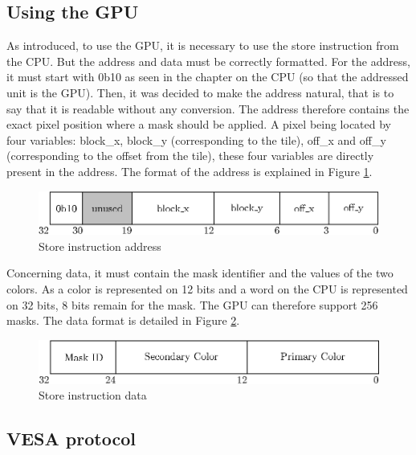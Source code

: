 \subsection{Using the GPU}

As introduced, to use the GPU, it is necessary to use the store instruction from the CPU. But the 
address and data must be correctly formatted. For the address, it must start with 0b10 as seen in 
the chapter on the CPU (so that the addressed unit is the GPU). Then, it was decided to make the 
address natural, that is to say that it is 
readable without any conversion. The address therefore contains the exact pixel position where 
a mask should be applied. A pixel being located by four variables: block\_x, block\_y (corresponding 
to the tile), off\_x and off\_y (corresponding to the offset from the tile), these four variables 
are directly present in the address. The format of the address is explained in 
Figure \ref{fig:gpu/store_address}.

\begin{figure}[H]
    \centering
    \includegraphics[scale=1.0]{Chapter4-GPU_CLKU/res/store_address}
    \caption{Store instruction address}
    \label{fig:gpu/store_address}
\end{figure}

Concerning data, it must contain the mask identifier and the values of the two colors. As a color is 
represented on 12 bits and a word on the CPU is represented on 32 bits, 8 bits remain for the mask.  
The GPU can therefore support 256 masks. The data format is detailed in 
Figure \ref{fig:gpu/store_data}.

\begin{figure}[H]
    \centering
    \includegraphics[scale=1.0]{Chapter4-GPU_CLKU/res/store_data}
    \caption{Store instruction data}
    \label{fig:gpu/store_data}
\end{figure}

\subsection{VESA protocol}

